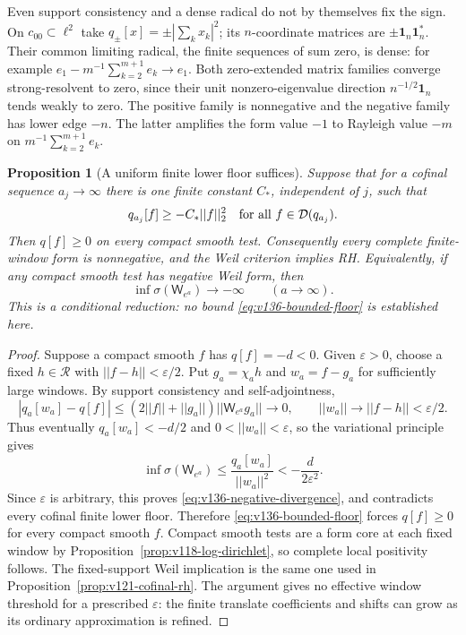 \documentclass[11pt]{article}
\def\norm#1{||#1||}%
\newtheorem{proposition}[theorem]{Proposition}
\theoremstyle{remark}
\newcommand{\norm}[1]{\left\lVert #1\right\rVert}
\begin{document}
Even support consistency and a dense radical do not by themselves
fix the sign. On $c_{00}\subset\ell^2$ take
$q_\pm[x]=\pm|\sum_kx_k|^2$; its $n$-coordinate matrices are
$\pm\mathbf1_n\mathbf1_n^*$. Their common limiting radical,
the finite sequences of sum zero, is dense: for example
$e_1-m^{-1}\sum_{k=2}^{m+1}e_k\to e_1$.
Both zero-extended matrix families converge strong-resolvent to zero,
since their unit nonzero-eigenvalue direction
$n^{-1/2}\mathbf1_n$ tends weakly to zero. The positive family is
nonnegative and the negative family has lower edge $-n$.
The latter amplifies the form value $-1$ to Rayleigh value $-m$
on $m^{-1}\sum_{k=2}^{m+1}e_k$.

\begin{proposition}[A uniform finite lower floor suffices]
\label{prop:v136-bounded-floor}
Suppose that for a cofinal sequence $a_j\to\infty$ there is one
finite constant $C_*$, independent of $j$, such that
\begin{equation}\label{eq:v136-bounded-floor}
 q_{a_j}[f]\ge-C_*\norm f_2^2
 \quad\hbox{for all }f\in\mathcal D(q_{a_j}).
\end{equation}
Then $q[f]\ge0$ on every compact smooth test. Consequently every
complete finite-window form is nonnegative, and the Weil criterion
implies RH. Equivalently, if any compact smooth test has negative
Weil form, then
\begin{equation}\label{eq:v136-negative-divergence}
 \inf\sigma(\mathsf W_{e^a})\longrightarrow-\infty
 \qquad(a\longrightarrow\infty).
\end{equation}
This is a conditional reduction: no bound \eqref{eq:v136-bounded-floor}
is established here.
\end{proposition}
\begin{proof}
Suppose a compact smooth $f$ has $q[f]=-d<0$. Given $\varepsilon>0$,
choose a fixed $h\in\mathcal R$ with $\norm{f-h}<\varepsilon/2$.
Put $g_a=\chi_a h$ and $w_a=f-g_a$ for sufficiently large windows.
By support consistency and self-adjointness,
\[
 |q_a[w_a]-q[f]|
 \le (2\norm f+\norm{g_a})\norm{\mathsf W_{e^a}g_a}
 \longrightarrow0,\qquad
 \norm{w_a}\longrightarrow\norm{f-h}<\varepsilon/2.
\]
Thus eventually $q_a[w_a]<-d/2$ and $0<\norm{w_a}<\varepsilon$,
so the variational principle gives
\begin{equation}\label{eq:v136-negative-amplification}
 \inf\sigma(\mathsf W_{e^a})
 \le\frac{q_a[w_a]}{\norm{w_a}^2}
 <-\frac{d}{2\varepsilon^2}.
\end{equation}
Since $\varepsilon$ is arbitrary, this proves
\eqref{eq:v136-negative-divergence}, and contradicts every cofinal
finite lower floor. Therefore \eqref{eq:v136-bounded-floor} forces
$q[f]\ge0$ for every compact smooth $f$.
Compact smooth tests are a form core at each fixed window by
Proposition~\ref{prop:v118-log-dirichlet}, so complete local
positivity follows. The fixed-support Weil implication is the same
one used in Proposition~\ref{prop:v121-cofinal-rh}.
The argument gives no effective window threshold for a prescribed
$\varepsilon$: the finite translate coefficients and shifts can grow
as its ordinary approximation is refined.
\end{proof}
\end{document}
